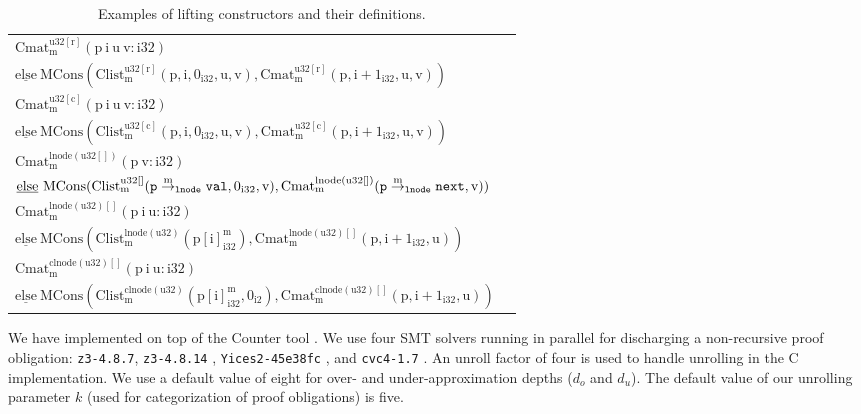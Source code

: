 \begin{table}
\begin{scriptsize}
\begin{tabular}{|l|l|}
\hline
$\mathrm{Cmat^{u32[r]}_m(p\ i\ u\ v:i32)}$ & \makecell[l]{\Tstrut $\mathrm{\underline{if}\ (i \geq_{u} u)}$ $\mathrm{\underline{then}\ MNil}$ \\ \Bstrut $\mathrm{\underline{else}\ MCons(Clist^{u32[r]}_m(p,i,0_{i32},u,v), Cmat^{u32[r]}_m(p,i+1_{i32},u,v))}$} \\
\hline
$\mathrm{Cmat^{u32[c]}_m(p\ i\ u\ v:i32)}$ & \makecell[l]{\Tstrut $\mathrm{\underline{if}\ (i \geq_{u} u)}$ $\mathrm{\underline{then}\ MNil}$ \\ \Bstrut $\mathrm{\underline{else}\ MCons(Clist^{u32[c]}_m(p,i,0_{i32},u,v), Cmat^{u32[c]}_m(p,i+1_{i32},u,v))}$} \\
\hline
$\mathrm{Cmat^{lnode(u32[])}_m(p\ v:i32)}$ & \makecell[l]{\Tstrut $\mathrm{\underline{if}\ (p==0_{i32})}$ $\mathrm{\underline{then}\ MNil}$ \\ \Bstrut $\mathrm{\underline{else}\ MCons(Clist^{u32[]}_m(\structPointer{\tt p}{m}{\tt lnode}{val},0_{i32},v),Cmat^{lnode(u32[])}_m(\structPointer{\tt p}{m}{\tt lnode}{next},v))}$} \\
\hline
$\mathrm{Cmat^{lnode(u32)[]}_m(p\ i\ u:i32)}$ & \makecell[l]{\Tstrut $\mathrm{\underline{if}\ (i \geq u)}$ $\mathrm{\underline{then}\ MNil}$ \\ \Bstrut $\mathrm{\underline{else}\ MCons(Clist^{lnode(u32)}_m(p[i]^m_{i32}), Cmat^{lnode(u32)[]}_m(p,i+1_{i32},u))}$} \\
\hline
$\mathrm{Cmat^{clnode(u32)[]}_m(p\ i\ u:i32)}$ & \makecell[l]{\Tstrut $\mathrm{\underline{if}\ (i \geq u)}$ $\mathrm{\underline{then}\ MNil}$ \\ \Bstrut $\mathrm{\underline{else}\ MCons(Clist^{clnode(u32)}_m(p[i]^m_{i32},0_{i2}), Cmat^{clnode(u32)[]}_m(p,i+1_{i32},u))}$} \\
\hline
\end{tabular}
\end{scriptsize}
\caption{\label{tab:LiftingConsTable}Examples of lifting constructors and their definitions.}
\vspace{-18px}
\end{table}
We have implemented \toolName{} on top of the
Counter tool \cite{oopsla20}.
We use four SMT solvers running in parallel for discharging
a non-recursive proof obligation: {\tt z3-4.8.7}, {\tt z3-4.8.14} \cite{z3},
{\tt Yices2-45e38fc} \cite{yices},
and {\tt cvc4-1.7} \cite{cvc4solver}.
An unroll factor of four is used to handle unrolling in the C implementation.
We use a default value of eight for
over- and under-approximation depths ($d_o$ and $d_u$).
The default value of
our unrolling parameter $k$ (used for categorization of proof obligations) is five.

